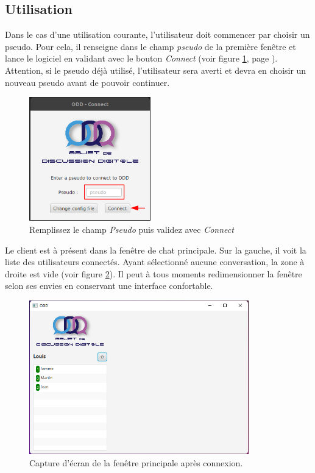 \documentclass[12pt, a4paper]{article}
\begin{document}
    \subsection{Utilisation}
    Dans le cas d'une utilisation courante, l'utilisateur doit commencer par choisir un pseudo. Pour cela, il renseigne dans le champ \textit{pseudo} de la première fenêtre et lance le logiciel en validant avec le bouton \textit{Connect} (voir figure \ref{login2}, page \pageref{login2}). Attention, si le pseudo déjà utilisé, l'utilisateur sera averti et devra en choisir un nouveau pseudo avant de pouvoir continuer.
    
    \begin{figure}[!htp]
        \centering
        \includegraphics[width=0.47\textwidth]{img/login2.png}
        \caption{Remplissez le champ \textit{Pseudo} puis validez avec \textit{Connect}}
        \label{login2}
    \end{figure}
    
    Le client est à présent dans la fenêtre de chat principale. Sur la gauche, il voit la liste des utilisateurs connectés. Ayant sélectionné aucune conversation, la zone à droite est vide (voir figure \ref{dm}). Il peut à tous moments redimensionner la fenêtre selon ses envies en conservant une interface confortable.

    \begin{figure}[!htp]
        \centering
        \includegraphics[width=0.85\textwidth]{img/mw/dm_window.png}
        \caption{Capture d'écran de la fenêtre principale après connexion.}
        \label{dm}
    \end{figure}
    
\end{document}

